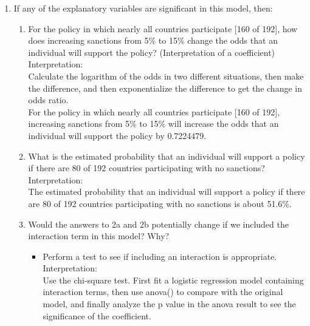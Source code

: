 \documentclass[12pt,letterpaper]{article}
\begin{document}
\begin{enumerate}
	\item
	If any of the explanatory variables are significant in this model, then:
	\begin{enumerate}
		\item
		For the policy in which nearly all countries participate [160 of 192], how does increasing sanctions from 5\% to 15\% change the odds that an individual will support the policy? (Interpretation of a coefficient)\\
		\noindent 
		Interpretation: \\		
		Calculate the logarithm of the odds in two different situations, then make the difference, and then exponentialize the difference to get the change in odds ratio.\\
		
		\noindent 
		For the policy in which nearly all countries participate [160 of 192], increasing sanctions from 5\% to 15\% will increase the odds  that an individual will support the policy by 0.7224479.
		\item
		What is the estimated probability that an individual will support a policy if there are 80 of 192 countries participating with no sanctions? \\
		
		Interpretation: \\		
		The estimated probability that an individual will support a policy if there are 80 of 192 countries participating with no sanctions is about 51.6\%.
		\item
		Would the answers to 2a and 2b potentially change if we included the interaction term in this model? Why? 
		\begin{itemize}
			\item Perform a test to see if including an interaction is appropriate.\\
			\vspace{.5cm}
		Interpretation: \\		
		Use the chi-square test. First fit a logistic regression model containing interaction terms, then use anova() to compare with the original model, and finally analyze the p value in the anova result to see the significance of the coefficient.\\

\end{itemize}
\end{enumerate}
\end{enumerate}
\end{document}
